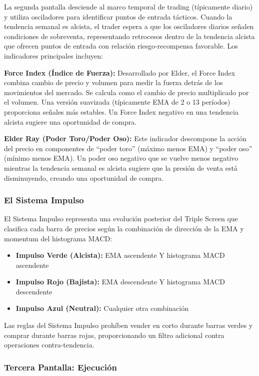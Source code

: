 \documentclass[11pt,a4paper]{article}
\begin{document}
La segunda pantalla desciende al marco temporal de trading (típicamente diario) y utiliza osciladores para identificar puntos de entrada tácticos. Cuando la tendencia semanal es alcista, el trader espera a que los osciladores diarios señalen condiciones de sobreventa, representando retrocesos dentro de la tendencia alcista que ofrecen puntos de entrada con relación riesgo-recompensa favorable. Los indicadores principales incluyen:

\textbf{Force Index (Índice de Fuerza):} Desarrollado por Elder, el Force Index combina cambio de precio y volumen para medir la fuerza detrás de los movimientos del mercado. Se calcula como el cambio de precio multiplicado por el volumen. Una versión suavizada (típicamente EMA de 2 o 13 períodos) proporciona señales más estables. Un Force Index negativo en una tendencia alcista sugiere una oportunidad de compra.

\textbf{Elder Ray (Poder Toro/Poder Oso):} Este indicador descompone la acción del precio en componentes de ``poder toro'' (máximo menos EMA) y ``poder oso'' (mínimo menos EMA). Un poder oso negativo que se vuelve menos negativo mientras la tendencia semanal es alcista sugiere que la presión de venta está disminuyendo, creando una oportunidad de compra.

\subsubsection{El Sistema Impulso}

El Sistema Impulso representa una evolución posterior del Triple Screen que clasifica cada barra de precios según la combinación de dirección de la EMA y momentum del histograma MACD:

\begin{itemize}[noitemsep]
    \item \textbf{Impulso Verde (Alcista):} EMA ascendente Y histograma MACD ascendente
    \item \textbf{Impulso Rojo (Bajista):} EMA descendente Y histograma MACD descendente
    \item \textbf{Impulso Azul (Neutral):} Cualquier otra combinación
\end{itemize}

Las reglas del Sistema Impulso prohíben vender en corto durante barras verdes y comprar durante barras rojas, proporcionando un filtro adicional contra operaciones contra-tendencia.

\subsubsection{Tercera Pantalla: Ejecución}
\end{document}
